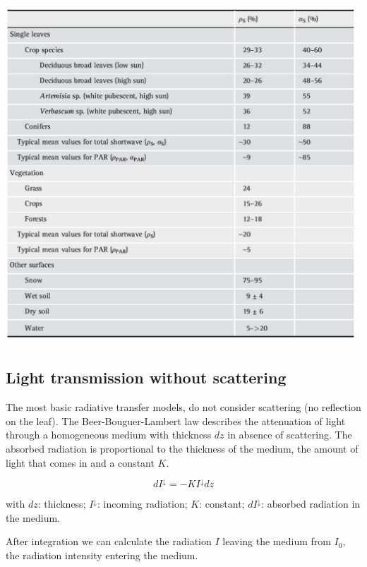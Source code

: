 \documentclass[
  12pt,
  oneside]{book}
\begin{document}
\begin{center}
\label{table:reflectance}

\begin{center}\includegraphics[width=0.8\linewidth]{figures/chap3/f38_table_optical} \end{center}
\end{center}

\hypertarget{light-transmission-without-scattering}{%
\subsection{Light transmission without scattering}\label{light-transmission-without-scattering}}

The most basic radiative transfer models, do not consider scattering (no reflection on the leaf). The Beer-Bouguer-Lambert law describes the attenuation of light through a homogeneous medium with thickness \(dz\) in absence of scattering. The absorbed radiation is proportional to the thickness of the medium, the amount of light that comes in and a constant \(K\).

\[
dI^{\downarrow} = -KI^\downarrow dz
\]

with \(dz\): thickness; \(I^\downarrow\): incoming radiation; \(K\): constant; \(dI^\downarrow\): absorbed radiation in the medium.

After integration we can calculate the radiation \(I\) leaving the medium from \(I_0\), the radiation intensity entering the medium.
\end{document}
